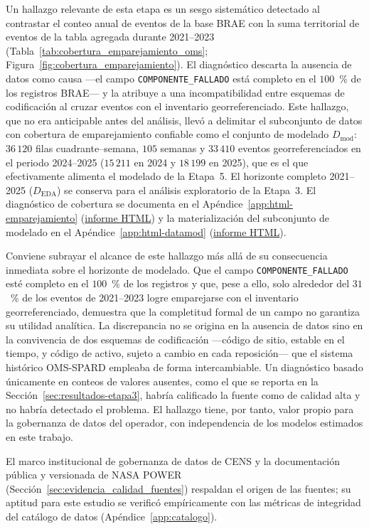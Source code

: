 Un hallazgo relevante de esta etapa es un sesgo sistemático detectado al contrastar el conteo anual de eventos de la base BRAE con la suma territorial de eventos de la tabla agregada durante 2021--2023 (Tabla~\ref{tab:cobertura_emparejamiento_oms}; Figura~\ref{fig:cobertura_emparejamiento}). El diagnóstico descarta la ausencia de datos como causa —el campo \texttt{COMPONENTE\_FALLADO} está completo en el $100$~\% de los registros BRAE— y la atribuye a una incompatibilidad entre esquemas de codificación al cruzar eventos con el inventario georreferenciado. Este hallazgo, que no era anticipable antes del análisis, llevó a delimitar el subconjunto de datos con cobertura de emparejamiento confiable como el conjunto de modelado $D_{\mathrm{mod}}$: $36\,120$ filas cuadrante--semana, $105$ semanas y $33\,410$ eventos georreferenciados en el periodo 2024--2025 ($15\,211$ en 2024 y $18\,199$ en 2025), que es el que efectivamente alimenta el modelado de la Etapa~5. El horizonte completo 2021--2025 ($D_{\mathrm{EDA}}$) se conserva para el análisis exploratorio de la Etapa~3. El diagnóstico de cobertura se documenta en el Apéndice~\ref{app:html-emparejamiento} (\href{\urlemparejamientoeventos}{informe HTML}) y la materialización del subconjunto de modelado en el Apéndice~\ref{app:html-datamod} (\href{\urlconsolidadodatamod}{informe HTML}).

Conviene subrayar el alcance de este hallazgo más allá de su consecuencia inmediata sobre el horizonte de modelado. Que el campo \texttt{COMPONENTE\_FALLADO} esté completo en el $100$~\% de los registros y que, pese a ello, solo alrededor del $31$~\% de los eventos de 2021--2023 logre emparejarse con el inventario georreferenciado, demuestra que la completitud formal de un campo no garantiza su utilidad analítica. La discrepancia no se origina en la ausencia de datos sino en la convivencia de dos esquemas de codificación —código de sitio, estable en el tiempo, y código de activo, sujeto a cambio en cada reposición— que el sistema histórico OMS-SPARD empleaba de forma intercambiable. Un diagnóstico basado únicamente en conteos de valores ausentes, como el que se reporta en la Sección~\ref{sec:resultados-etapa3}, habría calificado la fuente como de calidad alta y no habría detectado el problema. El hallazgo tiene, por tanto, valor propio para la gobernanza de datos del operador, con independencia de los modelos estimados en este trabajo.

El marco institucional de gobernanza de datos de CENS y la documentación pública y versionada de NASA POWER (Sección~\ref{sec:evidencia_calidad_fuentes}) respaldan el origen de las fuentes; su aptitud para este estudio se verificó empíricamente con las métricas de integridad del catálogo de datos (Apéndice~\ref{app:catalogo}).


